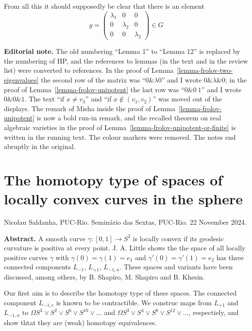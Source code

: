 From all this it should supposedly be clear
that there is an element
$$g=\begin{pmatrix} \lambda_1 & 0 & 0\\0 &
\lambda_2 & 0\\0 & 0 & \lambda_2
\end{pmatrix} \in G$$

\medskip\noindent
{\bf Editorial note.}
The old numbering ``Lemma 1'' to ``Lemma 12''
is replaced by the numbering of HP, and the
references to lemmas (in the text and in the
review list) were converted to references. In
the proof of
Lemma~\ref{lemma-frolov-two-eigenvalues} the
second row of the matrix was ``$0 \& \lambda
0$'' and I wrote $0 \& \lambda \& 0$; in the
proof of Lemma~\ref{lemma-frolov-unipotent}
the last row was ``$0 \& 0\ 1$'' and I wrote
$0 \& 0 \& 1$. The text ``if $x\neq v_3$''
and ``if $x\not\in(v_1,v_2)$'' was moved out
of the displays. The remark of Misha inside
the proof of
Lemma~\ref{lemma-frolov-unipotent} is now a
bold run-in remark, and the recalled theorem
on real algebraic varieties in the proof of
Lemma~\ref{lemma-frolov-unipotent-or-finite}
is written in the running text. The colour
markers were removed. The notes end abruptly
in the original.


\section{The homotopy type of spaces of
locally convex curves in the sphere}
\label{section-saldanha-loc-convex-curves}

\noindent
Nicolau Saldanha, PUC-Rio. Seminário das
Sextas, PUC-Rio. 22 November 2024.

\medskip\noindent
{\bf Abstract.}
A smooth curve $\gamma:[0,1]\to S^2$ is
locally convex if its geodesic curvature is
positiva at every point. J. A. Little shows
the the space of all locally positive curves
$\gamma$ with $\gamma(0)=\gamma(1)=e_1$ and
$\gamma'(0)=\gamma'(1)=e_2$ has three
connected components $L_{-1}$, $L_{+1}$,
$L_{-1,n}$. These spaces and variants have
been discussed, among others, by B. Shapiro,
M. Shapiro and B. Khesin.

Our first aim is to describe the homotopy
type of these spaces. The connected component
$L_{-1,c}$ is known to be contractible. We
construc maps from $L_{+1}$ and $L_{-1,n}$ to
$\Omega S^3 \vee S^2 \vee S^6 \vee S^{10}\vee
\ldots$ and $\Omega S^3\vee S^4 \vee S^8 \vee
S^{12} \vee \ldots$, respectiely, and show
thtat they are (weak) homotopy equivalences.

